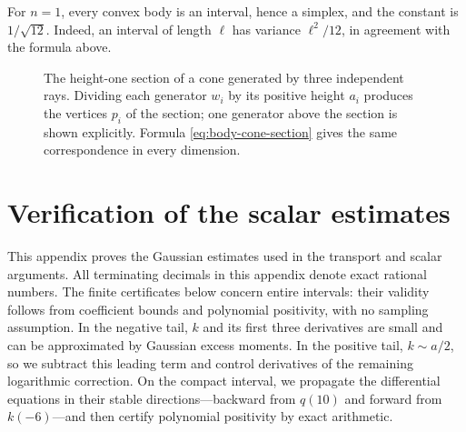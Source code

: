 \documentclass[11pt]{article}
\theoremstyle{definition}
\theoremstyle{remark}
\numberwithin{equation}{section}
\begin{document}
For $n=1$, every convex body is an interval, hence a simplex, and the
constant is $1/\sqrt{12}$.  Indeed, an interval of length $\ell$ has
variance $\ell^2/12$, in agreement with the formula above.

\begin{figure}[t]
\centering
{}
\caption{The height-one section of a cone generated by three independent
rays.  Dividing each generator $w_i$ by its positive height $a_i$
produces the vertices $p_i$ of the section; one generator above the
section is shown explicitly.  Formula
\eqref{eq:body-cone-section} gives the same correspondence in every
dimension.}
\label{fig:cone-section}
\end{figure}

\appendix
\section{Verification of the scalar estimates}\label{cert:verification}

This appendix proves the Gaussian estimates used in the transport and scalar
arguments. All terminating decimals in this appendix denote exact rational
numbers. The finite certificates below concern entire intervals: their
validity follows from coefficient bounds and polynomial positivity, with no
sampling assumption.
In the negative tail, $k$ and its first three derivatives are small and
can be approximated by Gaussian excess moments. In the positive tail,
$k\sim a/2$, so we subtract this leading term and control derivatives of
the remaining logarithmic correction. On the compact interval, we
propagate the differential equations in their stable directions---backward
from $q(10)$ and forward from $k(-6)$---and then certify polynomial
positivity by exact arithmetic.
\end{document}
